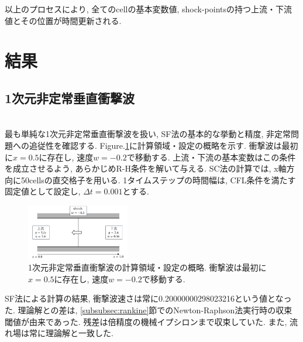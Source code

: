 \documentclass[a4j]{jarticle}
\begin{document}
以上のプロセスにより, 全てのcellの基本変数値, shock-pointsの持つ上流・下流値とその位置が時間更新される.

\section{結果}
\subsection{1次元非定常垂直衝撃波}\label{subsec:1D}
\mbox{}\\[-3.0ex]

最も単純な1次元非定常垂直衝撃波を扱い, SF法の基本的な挙動と精度, 非定常問題への追従性を確認する.
Figure.\ref{fig:1Dsituation}に計算領域・設定の概略を示す.
衝撃波は最初に$x=0.5$に存在し, 速度$w=-0.2$で移動する.
上流・下流の基本変数はこの条件を成立させるよう, あらかじめR-H条件を解いて与える.
SC法の計算では, x軸方向に50cellsの直交格子を用いる.
1タイムステップの時間幅は, CFL条件を満たす固定値として設定し, $\Delta t = 0.001$とする.
\begin{figure}[H]
    \vspace*{-5mm}
    \begin{center}
        \includegraphics[width=0.4\textwidth]{1Dsituation.pdf}
    \end{center}
    \caption{1次元非定常垂直衝撃波の計算領域・設定の概略.
    衝撃波は最初に$x=0.5$に存在し, 速度$w=-0.2$で移動する.}
    \label{fig:1Dsituation}
\end{figure}
SF法による計算の結果, 衝撃波速さは常に0.20000000298023216という値となった.
理論解との差は, \ref{subsubsec:rankine}節でのNewton-Raphson法実行時の収束閾値が由来であった. 
残差は倍精度の機械イプシロンまで収束していた. また, 流れ場は常に理論解と一致した.
\end{document}
